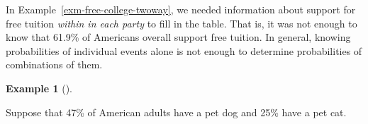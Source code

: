 \documentclass[
  letterpaper,
  DIV=11,
  numbers=noendperiod]{scrreprt}
\theoremstyle{plain}
\theoremstyle{definition}
\newtheorem{example}{Example}[chapter]
\theoremstyle{definition}
\theoremstyle{definition}
\theoremstyle{remark}
\begin{document}
In Example~\ref{exm-free-college-twoway}, we needed information about
support for free tuition \emph{within in each party} to fill in the
table. That is, it was not enough to know that 61.9\% of Americans
overall support free tuition. In general, knowing probabilities of
individual events alone is not enough to determine probabilities of
combinations of them.

\begin{tcolorbox}[enhanced jigsaw, opacityback=0, left=2mm, colframe=quarto-callout-note-color-frame, toprule=.15mm, breakable, colback=white, leftrule=.75mm, arc=.35mm, rightrule=.15mm, bottomrule=.15mm]

\begin{example}[]\protect\hypertarget{exm-cats-dogs}{}\label{exm-cats-dogs}

Suppose\footnotemark{} that 47\% of American adults\footnotemark{} have
a pet dog and 25\% have a pet cat.


\end{example}
\end{tcolorbox}
\end{document}
